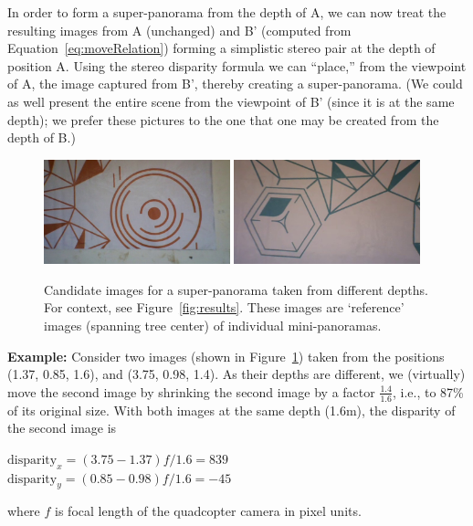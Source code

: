 In order to form a super-panorama from the depth of A, we can now
treat the resulting images from A (unchanged) and B’ (computed from
Equation~\ref{eq:moveRelation}) forming a simplistic stereo pair at
the depth of position A.  Using the stereo disparity formula we can
``place,'' from the viewpoint of A, the image captured from B',
thereby creating a super-panorama. (We could as well present the
entire scene from the viewpoint of B' (since it is at the same depth);
we prefer these pictures to the one that one may be created from the
depth of B.)


\begin{figure}[h]
\includegraphics[width=0.48\textwidth]{images/left}
\includegraphics[width=0.48\textwidth]{images/right}
\caption[Example of super-panorama]{Candidate images for a super-panorama taken
from different depths. For context, see Figure~\ref{fig:results}.  These images are
  `reference' images (spanning  tree center) of individual  mini-panoramas.}
\label{fig:exmaple}
\end{figure}

\textbf{Example:} Consider two images (shown in Figure~\ref{fig:exmaple}) taken from the positions
(1.37, 0.85, 1.6), and (3.75, 0.98, 1.4).  As their depths are
different, we (virtually) move the second image by shrinking the
second image by a factor $\frac{1.4}{1.6}$, i.e., to 87\% of its
original size. With both images at the same depth (1.6m), the 
disparity of the second image is 
\begin{center}
$\text{disparity}_x = (3.75 - 1.37)f/1.6 = 839$\\
$\text{disparity}_y = (0.85 - 0.98)f/1.6 = -45$
\end{center}
where $f$ is focal length of the quadcopter camera in pixel units.

